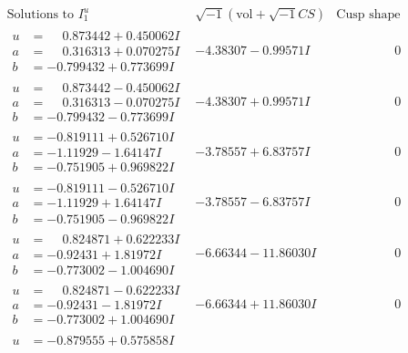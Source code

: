 \documentclass[1p]{elsarticle_modified}
\theoremstyle{definition}
\newcommand{\I}{\sqrt{-1}}
\begin{document}
$$\begin{array}{c|c|c}  
\text{Solutions to }I^u_{1}& \I (\text{vol} + \sqrt{-1}CS) & \text{Cusp shape}\\
 \hline 
\begin{aligned}
u &= \phantom{-}0.873442 + 0.450062 I \\
a &= \phantom{-}0.316313 + 0.070275 I \\
b &= -0.799432 + 0.773699 I\end{aligned}
 & -4.38307 - 0.99571 I & \phantom{-0.000000 } 0 \\ \hline\begin{aligned}
u &= \phantom{-}0.873442 - 0.450062 I \\
a &= \phantom{-}0.316313 - 0.070275 I \\
b &= -0.799432 - 0.773699 I\end{aligned}
 & -4.38307 + 0.99571 I & \phantom{-0.000000 } 0 \\ \hline\begin{aligned}
u &= -0.819111 + 0.526710 I \\
a &= -1.11929 - 1.64147 I \\
b &= -0.751905 + 0.969822 I\end{aligned}
 & -3.78557 + 6.83757 I & \phantom{-0.000000 } 0 \\ \hline\begin{aligned}
u &= -0.819111 - 0.526710 I \\
a &= -1.11929 + 1.64147 I \\
b &= -0.751905 - 0.969822 I\end{aligned}
 & -3.78557 - 6.83757 I & \phantom{-0.000000 } 0 \\ \hline\begin{aligned}
u &= \phantom{-}0.824871 + 0.622233 I \\
a &= -0.92431 + 1.81972 I \\
b &= -0.773002 - 1.004690 I\end{aligned}
 & -6.66344 - 11.86030 I & \phantom{-0.000000 } 0 \\ \hline\begin{aligned}
u &= \phantom{-}0.824871 - 0.622233 I \\
a &= -0.92431 - 1.81972 I \\
b &= -0.773002 + 1.004690 I\end{aligned}
 & -6.66344 + 11.86030 I & \phantom{-0.000000 } 0 \\ \hline\begin{aligned}
u &= -0.879555 + 0.575858 I \\

\end{aligned}
\end{array}$$
\end{document}
